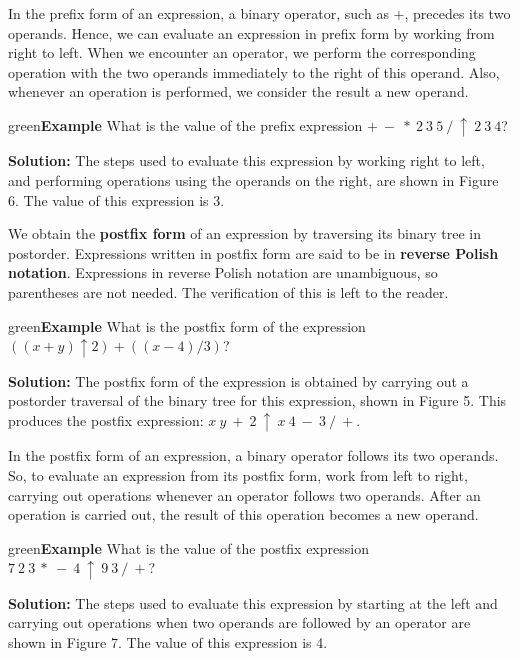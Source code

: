 \documentclass{article}
\newenvironment{example}{\begin{mybox}{green}{\textbf{Example}}}{\end{mybox}}
\begin{document}
\newpage
In the prefix form of an expression, a binary operator, such as +, precedes its two operands. Hence, we can evaluate an expression in prefix form by working from right to left. When we encounter an operator, we perform the corresponding operation with the two operands immediately to the right of this operand. Also, whenever an operation is performed, we consider the result a new operand.

\begin{example}
What is the value of the prefix expression $+\ -\ *\ 2\ 3\ 5\ /\ ↑\ 2\ 3\ 4$?

\textbf{Solution:}
The steps used to evaluate this expression by working right to left, and performing operations using the operands on the right, are shown in Figure 6. The value of this expression is 3.
\end{example}


We obtain the \textbf{postfix form} of an expression by traversing its binary tree in postorder. Expressions written in postfix form are said to be in \textbf{reverse Polish notation}. Expressions in reverse Polish notation are unambiguous, so parentheses are not needed. The verification of this is left to the reader.

\begin{example}
What is the postfix form of the expression $((x + y) ↑ 2) + ((x - 4)/3)$?

\textbf{Solution:}
The postfix form of the expression is obtained by carrying out a postorder traversal of the binary tree for this expression, shown in Figure 5. This produces the postfix expression: $x\ y\ +\ 2\ ↑\ x\ 4\ -\ 3\ /\ +$.
\end{example}

In the postfix form of an expression, a binary operator follows its two operands. So, to evaluate an expression from its postfix form, work from left to right, carrying out operations whenever an operator follows two operands. After an operation is carried out, the result of this operation becomes a new operand.

\begin{example}
What is the value of the postfix expression $7\ 2\ 3\ *\ -\ 4\ ↑\ 9\ 3\ /\ +$?

\textbf{Solution:}
The steps used to evaluate this expression by starting at the left and carrying out operations when two operands are followed by an operator are shown in Figure 7. The value of this expression is 4.
\end{example}
\end{document}
